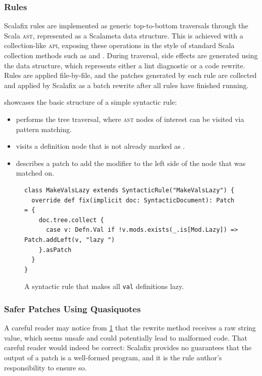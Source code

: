 \documentclass[../../main.tex]{subfiles}
\begin{document}
\subsubsection{Rules}
Scalafix rules are implemented as generic top-to-bottom traversals through the Scala \textsc{ast}, represented as a Scalameta  data structure.
This is achieved with a collection-like \textsc{api}, exposing these operations in the style of standard Scala collection methods such as  and .
During traversal, side effects are generated using the  data structure, which represents either a lint diagnostic or a code rewrite.
Rules are applied file-by-file, and the patches generated by each rule are collected and applied by Scalafix as a batch rewrite after all rules have finished running.

 showcases the basic structure of a simple syntactic rule:
\begin{itemize}
  \item {} performs the tree traversal, where \textsc{ast} nodes of interest can be visited via pattern matching.
  \item {} visits a  definition node that is not already marked as .
  \item {} describes a patch to add the  modifier to the left side of the node that was matched on.
\end{itemize}

\begin{figure}[htbp]
\begin{verbatim}
class MakeValsLazy extends SyntacticRule("MakeValsLazy") {
  override def fix(implicit doc: SyntacticDocument): Patch = {
    doc.tree.collect {
      case v: Defn.Val if !v.mods.exists(_.is[Mod.Lazy]) => Patch.addLeft(v, "lazy ")
    }.asPatch
  }
}
\end{verbatim}
\caption{A syntactic rule that makes all \texttt{val} definitions lazy.}
\label{fig:syntactic-rule-ex}
\end{figure}

\subsubsection{Safer Patches Using Quasiquotes}
A careful reader may notice from \cref{fig:syntactic-rule-ex} that the  rewrite method receives a raw string value, which seems unsafe and could potentially lead to malformed code.
That careful reader would indeed be correct:
Scalafix provides no guarantees that the output of a patch is a well-formed program, and it is the rule author's responsibility to ensure so.
\end{document}
